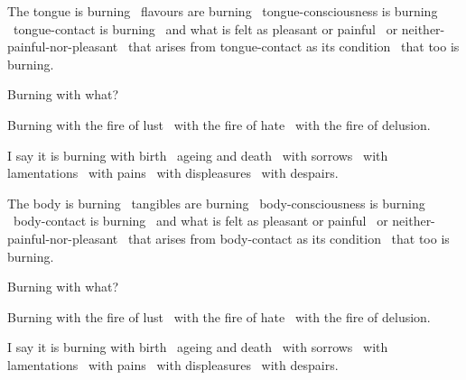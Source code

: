 \begin{english-only-hang}
  The tongue is burning \breathmark\ flavours are burning \breathmark\ tongue-consciousness is burning \breathmark\ tongue-contact is burning \breathmark\ and what is felt as pleasant or painful \breathmark\ or neither-painful-nor-pleasant \breathmark\ that arises from tongue-contact as its condition \breathmark\ that too is burning.
\end{english-only-hang}

\begin{english-only-hang}
  Burning with what?
\end{english-only-hang}

\begin{english-only-hang}
  Burning with the fire of lust \breathmark\ with the fire of hate \breathmark\ with the fire of delusion.
\end{english-only-hang}

\begin{english-only-hang}
  I say it is burning with birth \breathmark\ ageing and death \breathmark\ with sorrows \breathmark\ with lamentations \breathmark\ with pains \breathmark\ with displeasures \breathmark\ with despairs.
\end{english-only-hang}

\begin{english-only-hang}
  The body is burning \breathmark\ tangibles are burning \breathmark\ body-consciousness is burning \breathmark\ body-contact is burning \breathmark\ and what is felt as pleasant or painful \breathmark\ or neither-painful-nor-pleasant \breathmark\ that arises from body-contact as its condition \breathmark\ that too is burning.
\end{english-only-hang}

\begin{english-only-hang}
  Burning with what?
\end{english-only-hang}

\begin{english-only-hang}
  Burning with the fire of lust \breathmark\ with the fire of hate \breathmark\ with the fire of delusion.
\end{english-only-hang}

\begin{english-only-hang}
  I say it is burning with birth \breathmark\ ageing and death \breathmark\ with sorrows \breathmark\ with lamentations \breathmark\ with pains \breathmark\ with displeasures \breathmark\ with despairs.
\end{english-only-hang}

